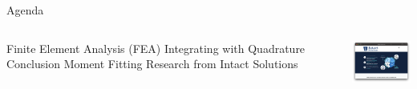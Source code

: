 \begin{frame}{Agenda}
\begin{columns}
\centering
\begin{outline}
  \1 Finite Element Analysis (FEA)
  \1 Integrating with Quadrature
  \1 Conclusion
  \1 Moment Fitting
  \1 Research from Intact Solutions \cite{Taber2018,Kumar2020}
\end{outline}

\centering
\includegraphics[width=3.5cm]{intact_website.png}


\end{columns}
\end{frame}


